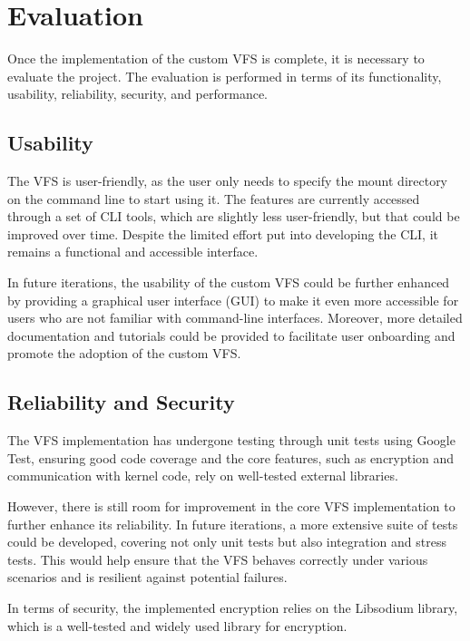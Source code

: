 \chapter{Evaluation}\label{chap:evaluation}

Once the implementation of the custom VFS is complete, it is necessary to evaluate the project.
The evaluation is performed in terms of its functionality, usability, reliability, security, and performance.


\section{Usability}\label{sec:usability}

The VFS is user-friendly, as the user only needs to specify the mount directory on the command line to start using it.
The features are currently accessed through a set of CLI tools, which are slightly less user-friendly, but that could be improved over time.
Despite the limited effort put into developing the CLI, it remains a functional and accessible interface.

In future iterations, the usability of the custom VFS could be further enhanced by providing a graphical user interface (GUI) to make it even more accessible for users who are not familiar with command-line interfaces.
Moreover, more detailed documentation and tutorials could be provided to facilitate user onboarding and promote the adoption of the custom VFS\@.


\section{Reliability and Security}\label{sec:reliability-and-security}

The VFS implementation has undergone testing through unit tests using Google Test, ensuring good code coverage and the core features, such as encryption and communication with kernel code, rely on well-tested external libraries.

However, there is still room for improvement in the core VFS implementation to further enhance its reliability.
In future iterations, a more extensive suite of tests could be developed, covering not only unit tests but also integration and stress tests.
This would help ensure that the VFS behaves correctly under various scenarios and is resilient against potential failures.

In terms of security, the implemented encryption relies on the Libsodium library, which is a well-tested and widely used library for encryption.


